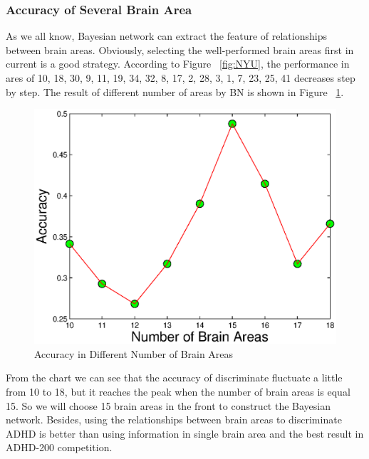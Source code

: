 \documentclass[10pt,twocolumn,letterpaper]{article}
\begin{document}
\subsubsection{Accuracy of Several Brain Area}
As we all know, Bayesian network can extract the feature of relationships between brain areas. Obviously, selecting the well-performed brain areas first in current is a good strategy. According to Figure ~\ref{fig:NYU}, the performance in ares of 10, 18, 30, 9, 11, 19, 34, 32, 8, 17, 2, 28, 3, 1, 7, 23, 25, 41 decreases step by step. The result of different number of areas by BN is shown in Figure ~\ref{fig:BN}. 
\begin{figure}[ht]
\begin{center}
   \includegraphics[width=0.7\linewidth]{BN.eps}
\end{center}
   \caption{Accuracy in Different Number of Brain Areas}
\label{fig:BN}
\end{figure}


From the chart we can see that the accuracy of discriminate fluctuate a little from 10 to 18, but it reaches the peak when the number of brain areas is equal 15. So we will choose 15 brain areas in the front to construct the Bayesian network. Besides, using the relationships between brain areas to discriminate ADHD is better than using information in single brain area and the best result in  ADHD-200 competition.
\end{document}
